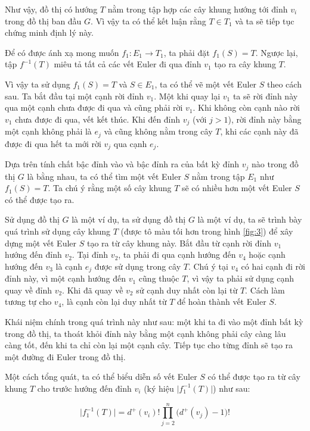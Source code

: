 \documentclass[14pt, a4paper]{article}
\numberwithin{equation}{section}
\numberwithin{figure}{section}
\numberwithin{dl}{section}
\numberwithin{md}{section}
\numberwithin{bd}{section}
\numberwithin{dn}{section}
\numberwithin{hq}{section}
\begin{document}
    Như vậy, đồ thị có hướng $T$ nằm trong tập hợp các cây khung hướng tới đỉnh $v_i$ trong đồ thị ban đầu $G$.
    Vì vậy ta có thể kết luận rằng $T \in T_1$ và ta sẽ tiếp tục chứng minh định lý này.

    Để có được ánh xạ mong muốn $f_1: E_1 \rightarrow T_1$, ta phải đặt $f_1(S) = T$.
    Ngược lại, tập $f^{-1} (T)$ miêu tả tất cả các vết Euler đi qua đỉnh $v_1$ tạo ra cây khung $T$.

    Vì vậy ta sử dụng $f_1(S)=T$ và $S \in E_1$, ta có thể vẽ một vết Euler $S$ theo cách sau.
    Ta bắt đầu tại một cạnh rời đỉnh $v_1$. Một khi quay lại $v_1$ ta sẽ rời đỉnh này qua một cạnh chưa được đi qua và cũng phải rời $v_1$.
    Khi không còn cạnh nào rời $v_1$ chưa được đi qua, vết kết thúc.
    Khi đến đỉnh $v_j$ (với $j > 1$), rời đỉnh này bằng một cạnh không phải là $e_j$ và cũng không nằm trong cây $T$, khi các cạnh này đã được đi qua hết ta mới rời $v_j$ qua cạnh $e_j$.

    Dựa trên tính chất bậc đỉnh vào và bậc đỉnh ra của bất kỳ đỉnh $v_j$ nào trong đồ thị $G$ là bằng nhau, ta có thể tìm một vết Euler $S$ nằm trong tập $E_1$ như $f_1(S)=T$.
    Ta chú ý rằng một số cây khung $T$ sẽ có nhiều hơn một vết Euler $S$ có thể được tạo ra.

    Sử dụng đồ thị $G$ là một ví dụ, ta sử dụng đồ thị $G$ là một ví dụ, ta sẽ trình bày quá trình sử dụng cây khung $T$ (được tô màu tối hơn trong hình \ref{fig:3}) để xây dựng một vết Euler $S$ tạo ra từ cây khung này.
    Bắt đầu từ cạnh rời đỉnh $v_1$ hướng đến đỉnh $v_2$. Tại đỉnh $v_2$, ta phải đi qua cạnh hướng đến $v_4$ hoặc cạnh hướng đến $v_3$ là cạnh $e_j$ được sử dụng trong cây $T$.
    Chú ý tại $v_4$ có hai cạnh đi rời đỉnh này, vì một cạnh hướng đến $v_1$ cũng thuộc $T$, vì vậy ta phải sử dụng cạnh quay về đỉnh $v_2$.
    Khi đã quay về $v_2$ sử cạnh duy nhất còn lại từ $T$.
    Cách làm tương tự cho $v_4$, là cạnh còn lại duy nhất từ $T$ để hoàn thành vết Euler $S$.

    Khái niệm chính trong quá trình này như sau: một khi ta đi vào một đỉnh bất kỳ trong đồ thị, ta thoát khỏi đỉnh này bằng một cạnh không phải cây càng lâu càng tốt, đến khi ta chỉ còn lại một cạnh cây.
    Tiếp tục cho từng đỉnh sẽ tạo ra một đường đi Euler trong đồ thị.

    Một cách tổng quát, ta có thể biểu diễn số vết Euler $S$ có thể được tạo ra từ cây khung $T$ cho trước hướng đến đỉnh $v_i$ (ký hiệu $\lvert f_1^{-1} (T) \rvert$) như sau:

    \begin{equation}
        \lvert f_1^{-1} (T) \rvert = d^+ (v_i)! \prod_{j=2}^n \big( d^+ (v_j) - 1 \big) !
    \end{equation}
\end{document}
